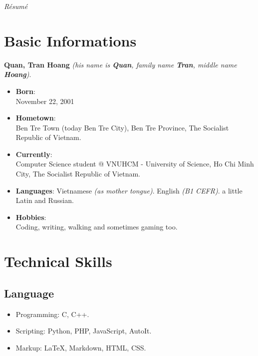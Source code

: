 \documentclass{article}
\renewcommand{\maketitle}{
    \begin{center}
        {\huge\bfseries\theauthor}
        \linebreak\linebreak
        \itshape{R\'esum\'e}
    \end{center}
}
\begin{document}
    \author{Quan, Tran Hoang}
    \maketitle

    \section{Basic Informations}
        {\bfseries Quan, Tran Hoang} {\itshape{(his name is {\bfseries{Quan}}, family name {\bfseries{Tran}}, middle name {\bfseries{Hoang}})}}.
        \begin{itemize}
            \item {\bfseries{Born}}: \\
                November 22, 2001
            \item {\bfseries{Hometown}}: \\
                Ben Tre Town (today Ben Tre City), Ben Tre Province, The Socialist Republic of Vietnam.
            \item {\bfseries{Currently}}: \\
                Computer Science student @ VNUHCM - University of Science, Ho Chi Minh City, The Socialist Republic of Vietnam.
            \item {\bfseries{Languages}}:
                \subitem Vietnamese {\itshape{(as mother tongue)}}.
                \subitem English {\itshape{(B1 CEFR)}}.
                \subitem a little Latin and Russian.
            \item {\bfseries{Hobbies}}: \\
                Coding, writing, walking and sometimes gaming too.
        \end{itemize}

    \section{Technical Skills}
        \subsection{Language}
            \begin{itemize}
                \item Programming: C, C++.
                \item Scripting: Python, PHP, JavaScript, AutoIt.
                \item Markup: \LaTeX, Markdown, HTML, CSS.
            \end{itemize}
\end{document}

